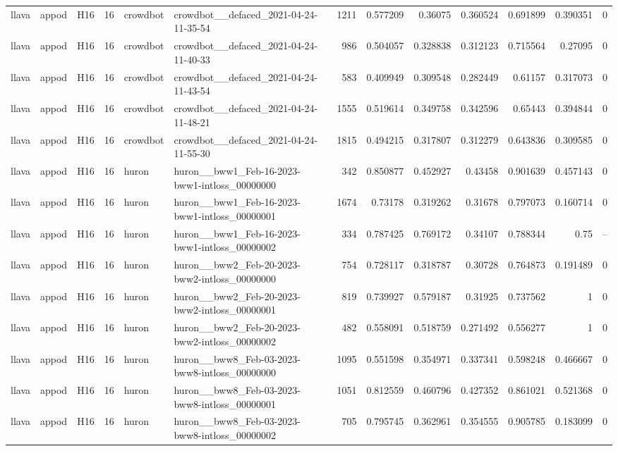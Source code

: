 \begin{longtable}{lllrllrrrrrrr}
llava & appod & H16 & 16 & crowdbot & crowdbot\_\_defaced\_2021-04-24-11-35-54 & 1211 & 0.577209 & 0.36075 & 0.360524 & 0.691899 & 0.390351 & 0 \\
llava & appod & H16 & 16 & crowdbot & crowdbot\_\_defaced\_2021-04-24-11-40-33 & 986 & 0.504057 & 0.328838 & 0.312123 & 0.715564 & 0.27095 & 0 \\
llava & appod & H16 & 16 & crowdbot & crowdbot\_\_defaced\_2021-04-24-11-43-54 & 583 & 0.409949 & 0.309548 & 0.282449 & 0.61157 & 0.317073 & 0 \\
llava & appod & H16 & 16 & crowdbot & crowdbot\_\_defaced\_2021-04-24-11-48-21 & 1555 & 0.519614 & 0.349758 & 0.342596 & 0.65443 & 0.394844 & 0 \\
llava & appod & H16 & 16 & crowdbot & crowdbot\_\_defaced\_2021-04-24-11-55-30 & 1815 & 0.494215 & 0.317807 & 0.312279 & 0.643836 & 0.309585 & 0 \\
llava & appod & H16 & 16 & huron & huron\_\_bww1\_Feb-16-2023-bww1-intloss\_00000000 & 342 & 0.850877 & 0.452927 & 0.43458 & 0.901639 & 0.457143 & 0 \\
llava & appod & H16 & 16 & huron & huron\_\_bww1\_Feb-16-2023-bww1-intloss\_00000001 & 1674 & 0.73178 & 0.319262 & 0.31678 & 0.797073 & 0.160714 & 0 \\
llava & appod & H16 & 16 & huron & huron\_\_bww1\_Feb-16-2023-bww1-intloss\_00000002 & 334 & 0.787425 & 0.769172 & 0.34107 & 0.788344 & 0.75 & -- \\
llava & appod & H16 & 16 & huron & huron\_\_bww2\_Feb-20-2023-bww2-intloss\_00000000 & 754 & 0.728117 & 0.318787 & 0.30728 & 0.764873 & 0.191489 & 0 \\
llava & appod & H16 & 16 & huron & huron\_\_bww2\_Feb-20-2023-bww2-intloss\_00000001 & 819 & 0.739927 & 0.579187 & 0.31925 & 0.737562 & 1 & 0 \\
llava & appod & H16 & 16 & huron & huron\_\_bww2\_Feb-20-2023-bww2-intloss\_00000002 & 482 & 0.558091 & 0.518759 & 0.271492 & 0.556277 & 1 & 0 \\
llava & appod & H16 & 16 & huron & huron\_\_bww8\_Feb-03-2023-bww8-intloss\_00000000 & 1095 & 0.551598 & 0.354971 & 0.337341 & 0.598248 & 0.466667 & 0 \\
llava & appod & H16 & 16 & huron & huron\_\_bww8\_Feb-03-2023-bww8-intloss\_00000001 & 1051 & 0.812559 & 0.460796 & 0.427352 & 0.861021 & 0.521368 & 0 \\
llava & appod & H16 & 16 & huron & huron\_\_bww8\_Feb-03-2023-bww8-intloss\_00000002 & 705 & 0.795745 & 0.362961 & 0.354555 & 0.905785 & 0.183099 & 0 \\

\end{longtable}
